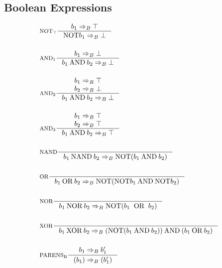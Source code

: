 \subsection{Boolean Expressions}
\begin{align*}
&\inference[$\text{NOT}_\top$]{b_1 \Rightarrow_B \top}
                       {\Tnot b_1 \Rightarrow_B \bot}
\\\\
&\inference[$\text{AND}_1$]{b_1 \Rightarrow_B \bot}
                    {b_1 \Tand b_2 \Rightarrow_B \bot}
\\\\
&\inference[$\text{AND}_2$]{b_1 \Rightarrow_B \top \\ b_2 \Rightarrow_B \bot}
								    {b_1 \Tand b_2 \Rightarrow_B \bot}
\\\\
&\inference[$\text{AND}_3$]{b_1 \Rightarrow_B \top \\ b_2 \Rightarrow_B \top}
								    {b_1 \Tand b_2 \Rightarrow_B \top}
\\\\
&\inference[NAND]{}
								   {b_1 \Tnand b_2 \Rightarrow_B \Tnot( b_1 \Tand b_2 )}
\\\\
&\inference[OR]{}
                 {b_1 \Tor b_2 \Rightarrow_B \Tnot(\Tnot b_1 \Tand \Tnot b_2)}
\\\\
&\inference[NOR]{}
								   {b_1 \Tnor b_2 \Rightarrow_B \Tnot( b_1 \;\; \textrm{OR} \;\; b_2 )}
\\\\
&\inference[XOR]{}
                  {b_1 \Txor b_2 \Rightarrow_B (\Tnot(b_1 \Tand b_2)) \Tand (b_1 \Tor b_2)}
\\\\
&\inference[$\text{PARENS}_\text{B}$]{b_1 \Rightarrow_B b_1'}
                       {(b_1) \Rightarrow_B (b_1')}
\end{align*}

